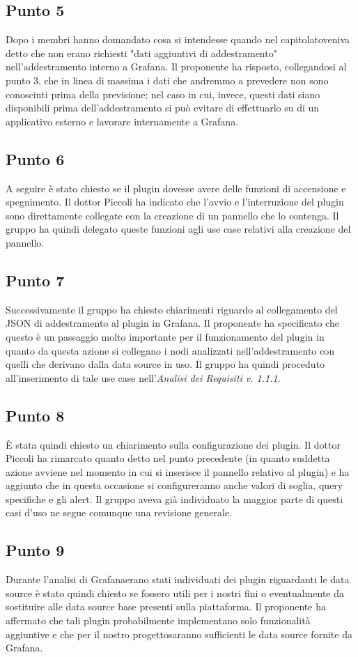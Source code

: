     \subsection{Punto 5}
        Dopo i membri hanno domandato cosa si intendesse quando nel capitolato\glosp veniva detto che non erano richiesti "dati aggiuntivi di addestramento" nell'addestramento interno a Grafana\glo. Il proponente ha risposto, collegandosi al punto 3, che in linea di massima i dati che andremmo a prevedere non sono conosciuti prima della previsione; nel caso in cui, invece, questi dati siano disponibili prima dell'addestramento si può evitare di effettuarlo su di un applicativo esterno e lavorare internamente a Grafana\glo.
    \subsection{Punto 6}
        A seguire è stato chiesto se il plugin dovesse avere delle funzioni di accensione e spegnimento. Il dottor Piccoli ha indicato che l'avvio e l'interruzione del plugin sono direttamente collegate con la creazione di un pannello che lo contenga. Il gruppo ha quindi delegato queste funzioni agli use case relativi alla creazione del pannello.
    \subsection{Punto 7}
        Successivamente il gruppo ha chiesto chiarimenti riguardo al collegamento del JSON di addestramento al plugin in Grafana\glo. Il proponente ha specificato che questo è un passaggio molto importante per il funzionamento del plugin in quanto da questa azione si collegano i nodi analizzati nell'addestramento con quelli che derivano dalla data source in uso. Il gruppo ha quindi proceduto all'inserimento di tale use case nell'\textit{Analisi dei Requisiti v. 1.1.1}.
    \subsection{Punto 8}
        È stata quindi chiesto un chiarimento sulla configurazione dei plugin. Il dottor Piccoli ha rimarcato quanto detto nel punto precedente (in quanto suddetta azione avviene nel momento in cui si inserisce il pannello relativo al plugin) e ha aggiunto che in questa occasione si configureranno anche valori di soglia, query specifiche e gli alert\glo. Il gruppo aveva già individuato la maggior parte di questi casi d'uso ne segue comunque una revisione generale.
    \subsection{Punto 9}
        Durante l'analisi di Grafana\glosp erano stati individuati dei plugin riguardanti le data source è stato quindi chiesto se fossero utili per i nostri fini o eventualmente da sostituire alle data source base presenti sulla piattaforma. Il proponente ha affermato che tali plugin probabilmente implementano solo funzionalità aggiuntive e che per il nostro progetto\glosp saranno sufficienti le data source fornite da Grafana\glo.
